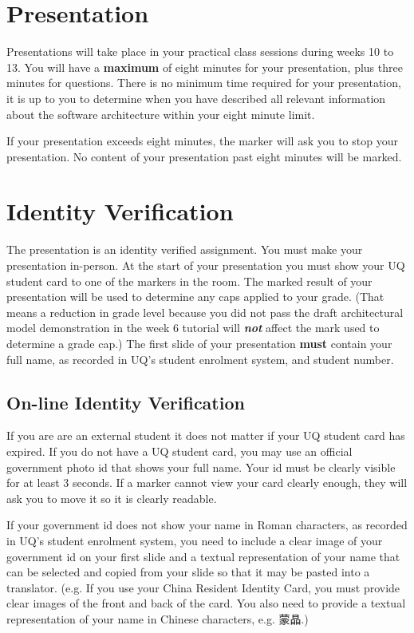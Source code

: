 \documentclass{csse4400}
\begin{document}
\section{Presentation}
Presentations will take place in your practical class sessions during weeks 10 to 13.
You will have a \textbf{maximum} of eight minutes for your presentation, plus three minutes for questions.
There is no minimum time required for your presentation,
it is up to you to determine when you have described all relevant information about the software architecture within your eight minute limit.

If your presentation exceeds eight minutes, the marker will ask you to stop your presentation.
No content of your presentation past eight minutes will be marked.


\section{Identity Verification}
The presentation is an identity verified assignment.
You must make your presentation in-person.
At the start of your presentation you must show your UQ student card to one of the markers in the room.
The marked result of your presentation will be used to determine any caps applied to your grade.
(That means a reduction in grade level because you did not pass the draft architectural model demonstration
in the week 6 tutorial will \textbf{\textit{not}} affect the mark used to determine a grade cap.)
The first slide of your presentation \textbf{must} contain your full name, as recorded in UQ's student enrolment system, and student number.

\subsection{On-line Identity Verification}
If you are are an external student it does not matter if your UQ student card has expired.
If you do not have a UQ student card, you may use an official government photo id that shows your full name.
Your id must be clearly visible for at least 3 seconds.
If a marker cannot view your card clearly enough, they will ask you to move it so it is clearly readable.

\begin{CJK*}{UTF8}{gbsn}
If your government id does not show your name in Roman characters, as recorded in UQ's student enrolment system,
you need to include a clear image of your government id on your first slide and a textual
representation of your name that can be selected and copied from your slide so that it may be pasted into a translator.
(e.g. If you use your China Resident Identity Card, you must provide clear images of the front and back
of the card. You also need to provide a textual representation of your name in Chinese characters, e.g. 蒙晶.)
\end{CJK*}
\end{document}
